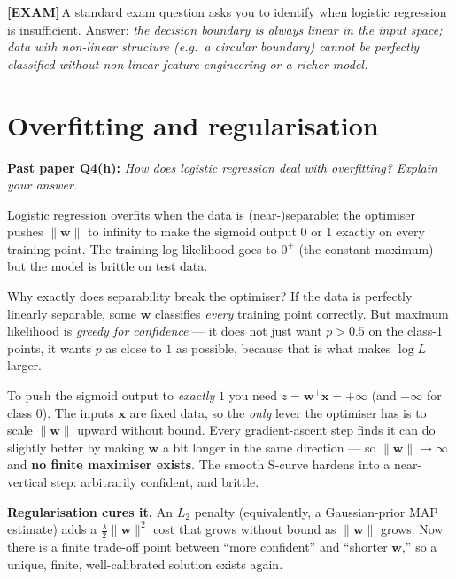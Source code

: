 \documentclass[11pt, a4paper]{article}
\newcommand{\examflag}{\textcolor{tipBd}{\textbf{[EXAM]}}\,}
\begin{document}
\examflag{}A standard exam question asks you to identify when logistic regression is insufficient. Answer: \emph{the decision boundary is always linear in the input space; data with non-linear structure (e.g.\ a circular boundary) cannot be perfectly classified without non-linear feature engineering or a richer model.}

\section{Overfitting and regularisation}

\textbf{Past paper Q4(h):} \emph{How does logistic regression deal with overfitting? Explain your answer.}

Logistic regression overfits when the data is (near-)separable: the optimiser pushes $\|\mathbf{w}\|$ to infinity to make the sigmoid output 0 or 1 exactly on every training point. The training log-likelihood goes to $0^+$ (the constant maximum) but the model is brittle on test data.

\begin{pitfallbox}
Why exactly does separability break the optimiser? If the data is perfectly linearly separable, some $\mathbf{w}$ classifies \emph{every} training point correctly. But maximum likelihood is \emph{greedy for confidence} --- it does not just want $p > 0.5$ on the class-1 points, it wants $p$ as close to $1$ as possible, because that is what makes $\log L$ larger.

To push the sigmoid output to \emph{exactly} $1$ you need $z = \mathbf{w}^\top\mathbf{x} = +\infty$ (and $-\infty$ for class 0). The inputs $\mathbf{x}$ are fixed data, so the \emph{only} lever the optimiser has is to scale $\|\mathbf{w}\|$ upward without bound. Every gradient-ascent step finds it can do slightly better by making $\mathbf{w}$ a bit longer in the same direction --- so $\|\mathbf{w}\|\to\infty$ and \textbf{no finite maximiser exists}. The smooth S-curve hardens into a near-vertical step: arbitrarily confident, and brittle.

\textbf{Regularisation cures it.} An $L_2$ penalty (equivalently, a Gaussian-prior MAP estimate) adds a $\tfrac{\lambda}{2}\|\mathbf{w}\|^2$ cost that grows without bound as $\|\mathbf{w}\|$ grows. Now there is a finite trade-off point between ``more confident'' and ``shorter $\mathbf{w}$,'' so a unique, finite, well-calibrated solution exists again.
\end{pitfallbox}
\end{document}
